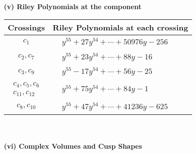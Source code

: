 \documentclass[1p]{elsarticle_modified}
\theoremstyle{definition}
\begin{document}
\newpage\renewcommand{\arraystretch}{1}
\flushleft \textbf{(v) Riley Polynomials at the component}\newline \\
\begin{tabular}{m{50pt}|m{274pt}}
Crossings & \hspace{64pt}Riley Polynomials at each crossing \\
\hline $$\begin{aligned}c_{1}\end{aligned}$$&$\begin{aligned}
&y^{55}+27 y^{54}+\cdots+50976 y-256
\end{aligned}$\\
\hline $$\begin{aligned}c_{2},c_{7}\end{aligned}$$&$\begin{aligned}
&y^{55}+23 y^{54}+\cdots+88 y-16
\end{aligned}$\\
\hline $$\begin{aligned}c_{3},c_{9}\end{aligned}$$&$\begin{aligned}
&y^{55}-17 y^{54}+\cdots+56 y-25
\end{aligned}$\\
\hline $$\begin{aligned}c_{4},c_{5},c_{6}\\c_{11},c_{12}\end{aligned}$$&$\begin{aligned}
&y^{55}+75 y^{54}+\cdots+84 y-1
\end{aligned}$\\
\hline $$\begin{aligned}c_{8},c_{10}\end{aligned}$$&$\begin{aligned}
&y^{55}+47 y^{54}+\cdots+41236 y-625
\end{aligned}$\\
\hline
\end{tabular}\\~\\
\newpage\flushleft \textbf{(vi) Complex Volumes and Cusp Shapes}
\end{document}
